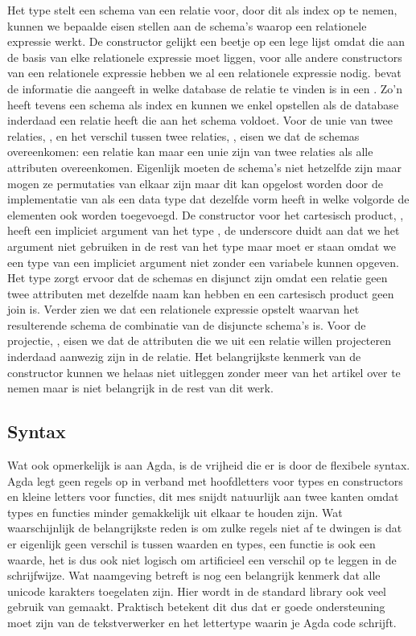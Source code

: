 Het type  stelt een schema van een relatie voor, door dit als
index op te nemen, kunnen we bepaalde eisen stellen aan de schema's waarop een
relationele expressie werkt. De  constructor gelijkt een beetje op
een lege lijst omdat die aan de basis van elke relationele expressie moet
liggen, voor alle andere constructors van een relationele expressie hebben we
al een relationele expressie nodig.  bevat de informatie die
aangeeft in welke database de relatie te vinden is in een . Zo'n
 heeft tevens een schema als index en kunnen we enkel opstellen
als de database inderdaad een relatie heeft die aan het schema voldoet. Voor de
unie van twee relaties, , en het verschil tussen twee relaties,
, eisen we dat de schemas overeenkomen: een relatie kan maar een
unie zijn van twee relaties als alle attributen overeenkomen. Eigenlijk moeten
de schema's niet hetzelfde zijn maar mogen ze permutaties van elkaar zijn maar
dit kan opgelost worden door de implementatie van  als een data
type dat dezelfde vorm heeft in welke volgorde de elementen ook worden
toegevoegd. De constructor voor het cartesisch product, , heeft
een impliciet argument van het type , de underscore
duidt aan dat we het argument niet gebruiken in de rest van het type maar moet
er staan omdat we een type van een impliciet argument niet zonder een variabele
kunnen opgeven. Het type  zorgt ervoor dat de schemas
 en  disjunct zijn omdat een relatie geen twee attributen
met dezelfde naam kan hebben en een cartesisch product geen join is. Verder
zien we dat  een relationele expressie opstelt waarvan het
resulterende schema de combinatie van de disjuncte schema's is. Voor de
projectie, , eisen we dat de attributen die we uit een relatie
willen projecteren inderdaad aanwezig zijn in de relatie. Het belangrijkste
kenmerk van de  constructor kunnen we helaas niet uitleggen
zonder meer van het artikel over te nemen maar is niet belangrijk in de rest
van dit werk.

\subsection{Syntax}

Wat ook opmerkelijk is aan Agda, is de vrijheid die er is door de flexibele
syntax. Agda legt geen regels op in verband met hoofdletters voor types en
constructors en kleine letters voor functies, dit mes snijdt natuurlijk aan
twee kanten omdat types en functies minder gemakkelijk uit elkaar te houden
zijn. Wat waarschijnlijk de belangrijkste reden is om zulke regels niet af te
dwingen is dat er eigenlijk geen verschil is tussen waarden en types, een
functie is ook een waarde, het is dus ook niet logisch om artificieel een
verschil op te leggen in de schrijfwijze. Wat naamgeving betreft is nog een
belangrijk kenmerk dat alle unicode karakters toegelaten zijn. Hier wordt in de
standard library ook veel gebruik van gemaakt. Praktisch betekent dit dus dat
er goede ondersteuning moet zijn van de tekstverwerker en het lettertype waarin
je Agda code schrijft.

